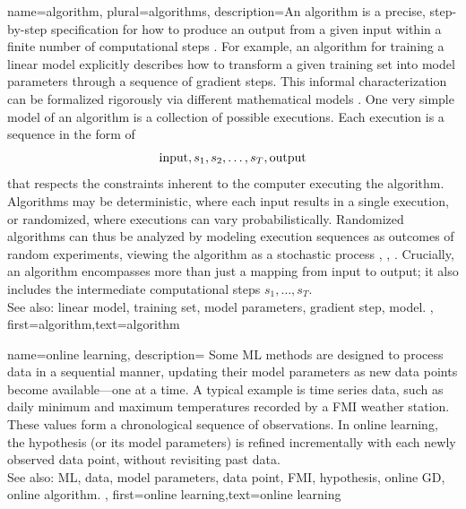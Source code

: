 {name={algorithm}, plural={algorithms},
  description={An algorithm is a precise, step-by-step specification for 
  	how to produce an output from a given input within a finite number of computational steps \cite{Cormen:2022aa}. 
    For example, an algorithm for training a linear model explicitly describes how to 
	transform a given training set into model parameters through a sequence of gradient steps. 
    This informal characterization can be formalized rigorously via different mathematical models \cite{Sipser2013}. 
    One very simple model of an algorithm is a collection of possible executions. Each execution is a sequence in the form of
    $${\rm input},s_1,s_2,\ldots,s_T,{\rm output}$$ 
    that respects the constraints inherent to the computer executing the algorithm.
	Algorithms may be deterministic, where each input results in a single execution,
	or randomized, where executions can vary probabilistically. Randomized algorithms 
	can thus be analyzed by modeling execution sequences as outcomes of random experiments, 
	viewing the algorithm as a stochastic process \cite{BertsekasProb}, \cite{RandomizedAlgos}, \cite{Gallager13}.
	Crucially, an algorithm encompasses more than just a mapping from input to output; it also includes 
	the intermediate computational steps $s_1,\ldots,s_T$. 
				\\ 
		See also: linear model, training set, model parameters, gradient step, model.
	},
	first={algorithm},text={algorithm} 
}

{name={online learning},
	description={
		Some ML methods  are designed to process data in a sequential 
		manner, updating their model parameters as new data points become available—one at a time. 
		A typical example is time series data, such as daily minimum and maximum temperatures 
		recorded by a FMI weather station. These values form a chronological sequence 
		of observations. In online learning, the hypothesis (or its model parameters) is refined 
		incrementally with each newly observed data point, without revisiting past data.  \\ 
		See also: ML, data, model parameters, data point, FMI, hypothesis, online GD, online algorithm. 
	},
	first={online learning},text={online learning} 
}

